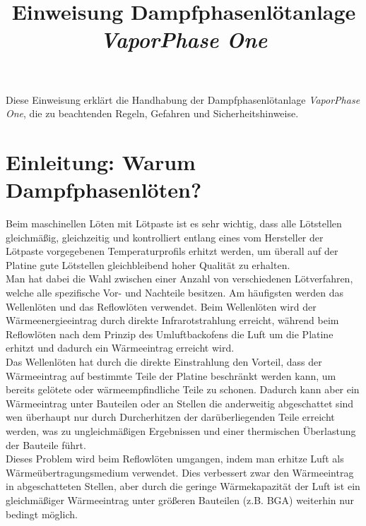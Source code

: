 \documentclass{\basedir/fablab-document}
\title{Einweisung Dampfphasenlötanlage \textit{VaporPhase One}}
\makeatletter
\newcommand{\smaller}{\ifdim\f@size pt>10pt \small \fi}
\newcommand{\english}[1]{{\smaller \color{gray} \itshape #1}}
\renewcommand{\english}[1]{}
\makeatother
\begin{document}
	\maketitle

	Diese Einweisung erklärt die Handhabung der Dampfphasenlötanlage \textit{VaporPhase One}, die zu beachtenden Regeln, Gefahren und Sicherheitshinweise.
	
	\english{This instruction explains use of the vapor phase soldering unit \textit{VaporPhase One}, and the associated rules, hazards and safety advice.}
	
	
	\section{Einleitung: Warum Dampfphasenlöten?}
	
	Beim maschinellen Löten mit Lötpaste ist es sehr wichtig, dass alle Lötstellen gleichmäßig, gleichzeitig und kontrolliert entlang eines vom Hersteller der Lötpaste vorgegebenen Temperaturprofils erhitzt werden, um überall auf der Platine gute Lötstellen gleichbleibend hoher Qualität zu erhalten. \\
	
	Man hat dabei die Wahl zwischen einer Anzahl von verschiedenen Lötverfahren, welche alle spezifische Vor- und Nachteile besitzen. Am häufigsten werden das Wellenlöten und das Reflowlöten verwendet. Beim Wellenlöten wird der Wärmeenergieeintrag durch direkte Infrarotstrahlung erreicht, während beim Reflowlöten nach dem Prinzip des Umluftbackofens die Luft um die Platine erhitzt und dadurch ein Wärmeeintrag erreicht wird.\\
	
	Das Wellenlöten hat durch die direkte Einstrahlung den Vorteil, dass der Wärmeeintrag auf bestimmte Teile der Platine beschränkt werden kann, um bereits gelötete oder wärmeempfindliche Teile zu schonen. Dadurch kann aber ein Wärmeeintrag unter Bauteilen oder an Stellen die anderweitig abgeschattet sind wen überhaupt nur durch Durcherhitzen der darüberliegenden Teile erreicht werden, was zu ungleichmäßigen Ergebnissen und einer thermischen Überlastung der Bauteile führt.\\
	
	Dieses Problem wird beim Reflowlöten umgangen, indem man erhitze Luft als Wärmeübertragungsmedium verwendet. Dies verbessert zwar den Wärmeeintrag in abgeschatteten Stellen, aber durch die geringe Wärmekapazität der Luft ist ein gleichmäßiger Wärmeeintrag unter größeren Bauteilen (z.B. BGA) weiterhin nur bedingt möglich.\\
	
\end{document}

